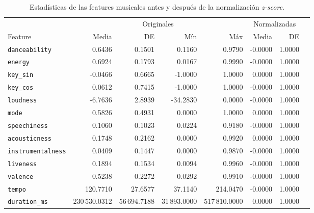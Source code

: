 \begin{table}[htbp]
\centering
\caption{Estadísticas de las features musicales antes y después de la normalización \textit{z-score}.}
\label{tab:normalization_stats}
\small
\begin{tabular}{lrrrrrrr}
\toprule
 & \multicolumn{4}{c}{Originales} & \multicolumn{2}{c}{Normalizadas} \\
\cmidrule(lr){2-5} \cmidrule(lr){6-7}
Feature & Media & DE & Mín & Máx & Media & DE \\
\midrule
\texttt{danceability} & 0.6436 & 0.1501 & 0.1160 & 0.9790 & -0.0000 & 1.0000 \\
\texttt{energy} & 0.6924 & 0.1793 & 0.0167 & 0.9990 & -0.0000 & 1.0000 \\
\texttt{key\_sin} & -0.0466 & 0.6665 & -1.0000 & 1.0000 & 0.0000 & 1.0000 \\
\texttt{key\_cos} & 0.0612 & 0.7415 & -1.0000 & 1.0000 & -0.0000 & 1.0000 \\
\texttt{loudness} & -6.7636 & 2.8939 & -34.2830 & 0.0000 & -0.0000 & 1.0000 \\
\texttt{mode} & 0.5826 & 0.4931 & 0.0000 & 1.0000 & 0.0000 & 1.0000 \\
\texttt{speechiness} & 0.1060 & 0.1023 & 0.0224 & 0.9180 & -0.0000 & 1.0000 \\
\texttt{acousticness} & 0.1748 & 0.2162 & 0.0000 & 0.9920 & 0.0000 & 1.0000 \\
\texttt{instrumentalness} & 0.0409 & 0.1447 & 0.0000 & 0.9870 & -0.0000 & 1.0000 \\
\texttt{liveness} & 0.1894 & 0.1534 & 0.0094 & 0.9960 & -0.0000 & 1.0000 \\
\texttt{valence} & 0.5238 & 0.2272 & 0.0292 & 0.9910 & -0.0000 & 1.0000 \\
\texttt{tempo} & 120.7710 & 27.6577 & 37.1140 & 214.0470 & -0.0000 & 1.0000 \\
\texttt{duration\_ms} & 230\,530.0312 & 56\,694.7188 & 31\,893.0000 & 517\,810.0000 & 0.0000 & 1.0000 \\
\bottomrule
\end{tabular}
\end{table}